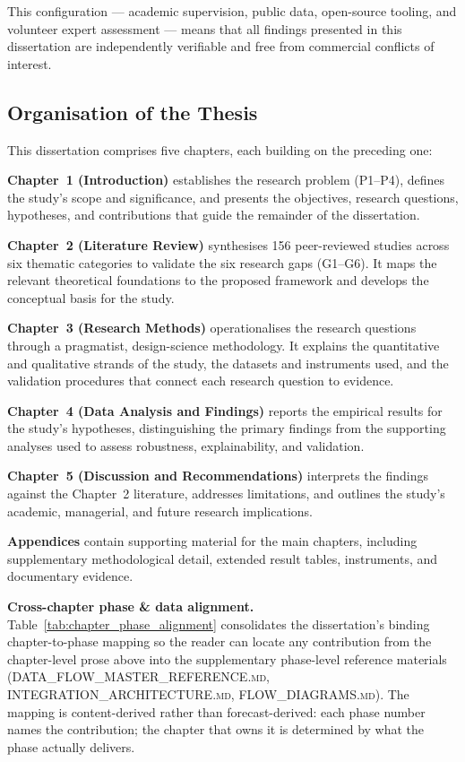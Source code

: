 \noindent This configuration --- academic supervision, public data, open-source tooling, and volunteer expert assessment --- means that all findings presented in this dissertation are independently verifiable and free from commercial conflicts of interest.

\subsection{Organisation of the Thesis}
\label{sec:thesis_organisation}

This dissertation comprises five chapters, each building on the preceding one:

\textbf{Chapter~1 (Introduction)} establishes the research problem (P1--P4), defines the study's scope and significance, and presents the objectives, research questions, hypotheses, and contributions that guide the remainder of the dissertation.

\textbf{Chapter~2 (Literature Review)} synthesises 156 peer-reviewed studies across six thematic categories to validate the six research gaps (G1--G6). It maps the relevant theoretical foundations to the proposed framework and develops the conceptual basis for the study.

\textbf{Chapter~3 (Research Methods)} operationalises the research questions through a pragmatist, design-science methodology. It explains the quantitative and qualitative strands of the study, the datasets and instruments used, and the validation procedures that connect each research question to evidence.

\textbf{Chapter~4 (Data Analysis and Findings)} reports the empirical results for the study's hypotheses, distinguishing the primary findings from the supporting analyses used to assess robustness, explainability, and validation.

\textbf{Chapter~5 (Discussion and Recommendations)} interprets the findings against the Chapter~2 literature, addresses limitations, and outlines the study's academic, managerial, and future research implications.

\textbf{Appendices} contain supporting material for the main chapters, including supplementary methodological detail, extended result tables, instruments, and documentary evidence.

\noindent\textbf{Cross-chapter phase \& data alignment.} Table~\ref{tab:chapter_phase_alignment} consolidates the dissertation's binding chapter-to-phase mapping so the reader can locate any contribution from the chapter-level prose above into the supplementary phase-level reference materials (\textsc{DATA\_FLOW\_MASTER\_REFERENCE.md}, \textsc{INTEGRATION\_ARCHITECTURE.md}, \textsc{FLOW\_DIAGRAMS.md}). The mapping is content-derived rather than forecast-derived: each phase number names the contribution; the chapter that owns it is determined by what the phase actually delivers.

